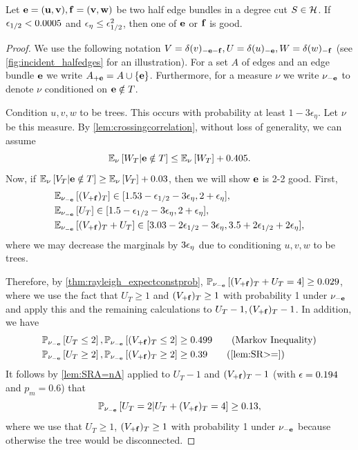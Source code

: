 \begin{lemma}\label{lem:one-of-two-good}
Let ${\bf e}={\bf (u,v)},{\bf f}={\bf (v,w)}$ be two half edge bundles in a degree cut $S\in\mathcal{H}$. If ${\epsilon}_{1/2} < 0.0005$ and ${\epsilon}_\eta \le {\epsilon}_{1/2}^2$, then one of ${\bf e}$ or ${\bf f}$ is good.
\end{lemma}
\begin{proof}
We use the following notation $V=\delta(v)_{-{\bf e}-{\bf f}},U=\delta(u)_{-{\bf e}},W=\delta(w)_{-{\bf f}}$ (see \cref{fig:incident_halfedges} for an illustration). For a set $A$ of edges and an edge bundle ${\bf e}$ we write $A_{+{\bf e}}=A\cup\{{\bf e}\}$. Furthermore, for a measure $\nu$ we write $\nu_{-{\bf e}}$ to denote $\nu$ conditioned on ${\bf e}\notin T$. 

Condition $u,v,w$ to be trees. %
This occurs with probability at least $1-3\epsilon_\eta$.
Let $\nu$ be this measure. By \cref{lem:crossingcorrelation}, without loss of generality, we can  assume 
\begin{equation}\label{eq:Wtgoesup405}
{\mathbb{E}}_{\nu}\left[W_T | {\bf e}\notin T\right]\leq {\mathbb{E}}_{\nu}\left[W_T\right]+0.405.
\end{equation}
Now, if ${\mathbb{E}}_{\nu}\left[V_T | {\bf e}\notin T\right]\geq {\mathbb{E}}_{\nu}\left[V_T\right]+0.03$, then we will show ${\bf e}$ is 2-2 good. First, 
\begin{align*}
	& {\mathbb{E}}_{\nu_{-{\bf e}}}\left[(V_{+{\bf f}})_T\right]\in [1.53-{\epsilon}_{1/2}-3{\epsilon}_\eta, 2+{\epsilon}_{\eta}],\\
	&{\mathbb{E}}_{\nu_{-{\bf e}}}\left[U_T\right]\in [1.5-{\epsilon}_{1/2}-3{\epsilon}_\eta, 2+{\epsilon}_{\eta}],\\
	&{\mathbb{E}}_{\nu_{-{\bf e}}}\left[(V_{+{\bf f}})_T+U_T\right] \in [3.03-2{\epsilon}_{1/2}-3{\epsilon}_\eta, 3.5+2{\epsilon}_{1/2}+2{\epsilon}_\eta],
\end{align*}
where we may decrease the marginals by $3{\epsilon}_\eta$ due to conditioning $u,v,w$ to be trees.

Therefore, by \cref{thm:rayleigh_expectconstprob}, ${\mathbb{P}}_{\nu_{-{\bf e}}}\left[(V_{+{\bf f}})_T+U_T=4\right] \geq 0.029$, where we use the fact that $U_T\geq 1$ and $(V_{+{\bf f}})_T\geq 1$ with probability 1 under $\nu_{-{\bf e}}$ and apply this and  the remaining calculations to $U_T-1,(V_{+{\bf f}})_T-1$. In addition, we have
\begin{align*}
&\PP{\nu_{-\bbe}}{U_T\leq 2},\PP{\nu_{-\bbe}}{(V_{+\bbf})_T\leq 2}\geq 0.499 \tag{Markov Inequality}\\
& \PP{\nu_{-\bbe}}{U_T\geq 2},\PP{\nu_{-\bbe}}{(V_{+\bbf})_T\geq 2}\geq   0.39
\tag{\cref{lem:SR>=}}
\end{align*}
It follows by \cref{lem:SRA=nA} applied to $U_T-1$ and $(V_{+{\bf f}})_T-1$ (with ${\epsilon}=0.194$ and $p_m=0.6$) that 
$${\mathbb{P}}_{\nu_{-{\bf e}}}\left[U_T= 2 | U_T+(V_{+{\bf f}})_T=4\right] \geq 0.13,$$
where we use that $U_T \ge 1$, $(V_{+{\bf f}})_T \ge 1$ with probability 1 under $\nu_{-{\bf e}}$ because otherwise the tree would be disconnected.


\end{proof}
